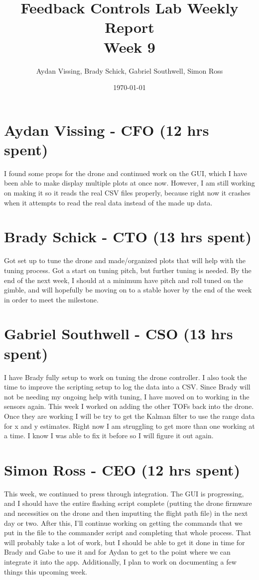 \documentclass[12pt, titlepage]{article}
\title{Feedback Controls Lab Weekly Report \\ \normalsize{Week 9}}
\author{Aydan Vissing, Brady Schick, Gabriel Southwell, Simon Ross}
\date{\today}
\begin{document}
\maketitle

\section*{Aydan Vissing - CFO (12 hrs spent)}

I found some props for the drone and continued work on the GUI, which I have been able to make display multiple plots at once now.  However, I am still working on making it so it reads the real CSV files properly, because right now it crashes when it attempts to read the real data instead of the made up data. 

\section*{Brady Schick - CTO (13 hrs spent)}

Got set up to tune the drone and made/organized plots that will help with the tuning process. Got a start on tuning pitch, but further tuning is needed. By the end of the next week, I should at a minimum have pitch and roll tuned on the gimble, and will hopefully be moving on to a stable hover by the end of the week in order to meet the milestone.

\section*{Gabriel Southwell - CSO (13 hrs spent)}

I have Brady fully setup to work on tuning the drone controller. I also took the time to improve the scripting setup to log the data into a CSV. Since Brady will not be needing my ongoing help with tuning, I have moved on to working in the sensors again. This week I worked on adding the other TOFs back into the drone. Once they are working I will be try to get the Kalman filter to use the range data for x and y estimates. Right now I am struggling to get more than one working at a time. I know I was able to fix it before so I will figure it out again.

\section*{Simon Ross - CEO (12 hrs spent)}

This week, we continued to press through integration. The GUI is progressing, and I should have the entire flashing script complete (putting the drone firmware and necessities on the drone and then imputting the flight path file) in the next day or two. After this, I'll continue working on getting the commands that we put in the file to the commander script and completing that whole process. That will probably take a lot of work, but I should be able to get it done in time for Brady and Gabe to use it and for Aydan to get to the point where we can integrate it into the app. Additionally, I plan to work on documenting a few things this upcoming week.
\end{document}

